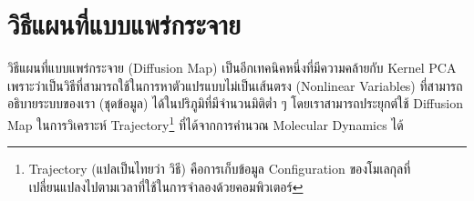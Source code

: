 \section{วิธีแผนที่แบบแพร่กระจาย}
\label{sec:diff_map}

วิธีแผนที่แบบแพร่กระจาย (Diffusion Map)\autocite{coifman2005,coifman2006} เป็นอีกเทคนิคหนึ่งที่มีความคล้ายกับ Kernel PCA เพราะว่าเป็นวิธีที่สามารถใช้ในการหาตัวแปรแบบไม่เป็นเส้นตรง (Nonlinear Variables) ที่สามารถอธิบายระบบของเรา (ชุดข้อมูล) ได้ในปริภูมิที่มีจำนวนมิติต่ำ ๆ โดยเราสามารถประยุกต์ใช้ Diffusion Map ในการวิเคราะห์ Trajectory\footnote{Trajectory (แปลเป็นไทยว่า วิธี) คือการเก็บข้อมูล Configuration ของโมเลกุลที่เปลี่ยนแปลงไปตามเวลาที่ใช้ในการจำลองด้วยคอมพิวเตอร์} ที่ได้จากการคำนวณ Molecular Dynamics ได้

